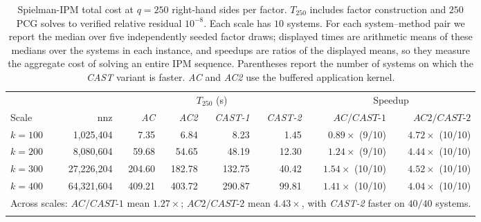 \documentclass{article}
\newcommand{\CAST}{\textit{CAST}\xspace}
\newcommand{\CASTone}{\textit{CAST-1}\xspace}
\newcommand{\CASTtwo}{\textit{CAST-2}\xspace}
\newcommand{\AC}{\textit{AC}\xspace}
\newcommand{\ACtwo}{\textit{AC2}\xspace}
\newcommand{\1}{\mathbbm{1}}
\theoremstyle{plain}
\begin{document}
\begin{table}[t]
\centering
\caption{Spielman-IPM total cost at $q=250$ right-hand sides per
factor. $T_{250}$ includes factor construction and $250$ PCG solves to
verified relative residual $10^{-8}$. Each scale has $10$ systems. For each system--method pair we
report the median over five independently seeded factor draws;
displayed times are arithmetic means of these medians over the systems
in each instance, and speedups are ratios of the displayed means, so they
measure the aggregate cost of solving an entire IPM sequence.
Parentheses report the number of systems on which the \CAST{} variant
is faster. \AC{} and \ACtwo{} use the buffered application kernel.}
\label{tab:spielman_tot}
\small
\begin{tabular}{l r rrrr rr}
\toprule
& & \multicolumn{4}{c}{$T_{250}$ (s)} &
\multicolumn{2}{c}{Speedup} \\
\cmidrule(lr){3-6}\cmidrule(lr){7-8}
Scale & nnz &
\AC & \ACtwo & \CASTone & \CASTtwo &
$\AC/\CASTone$ & $\ACtwo/\CASTtwo$ \\
\midrule
$k=100$ & 1{,}025{,}404 & 7.35 & 6.84 & 8.23 & 1.45 &
$0.89\times$ (9/10) & $4.72\times$ (10/10) \\
$k=200$ & 8{,}080{,}604 & 59.68 & 54.65 & 48.19 & 12.30 &
$1.24\times$ (9/10) & $4.44\times$ (10/10) \\
$k=300$ & 27{,}226{,}204 & 204.60 & 182.78 & 132.75 & 40.42 &
$1.54\times$ (10/10) & $4.52\times$ (10/10) \\
$k=400$ & 64{,}321{,}604 & 409.21 & 403.72 & 290.87 & 99.81 &
$1.41\times$ (10/10) & $4.04\times$ (10/10) \\
\midrule
\multicolumn{8}{l}{Across scales: $\AC/\CASTone$ mean $1.27\times$;
$\ACtwo/\CASTtwo$ mean $\mathbf{4.43\times}$, with \CASTtwo{} faster
on $40/40$ systems.} \\ \\
\bottomrule
\end{tabular}
\end{table}
\end{document}
